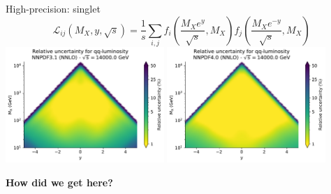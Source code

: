 \documentclass[aspectratio=169,9pt]{beamer}
\begin{document}
\begin{frame}[t]{High-precision: singlet }
	\begin{equation*}
	\mathcal{L}_{i j}\left(M_{X}, y, \sqrt{s}\right)
	=\frac{1}{s} \sum_{i, j} f_{i}\left(\frac{M_{X} e^{y}}{\sqrt{s}}, M_{X}\right) f_{j}\left(\frac{M_{X} e^{-y}}{\sqrt{s}}, M_{X}\right)
	\end{equation*}
	\includegraphics[width=0.45\textwidth]{plot_lumi2d_uncertainty_NNPDF31_qq}
	\includegraphics[width=0.45\textwidth]{plot_lumi2d_uncertainty_NNPDF40_qq}\\
	\begin{center}
	    \textbf{How did we get here?}
	\end{center}
\end{frame}
\end{document}
